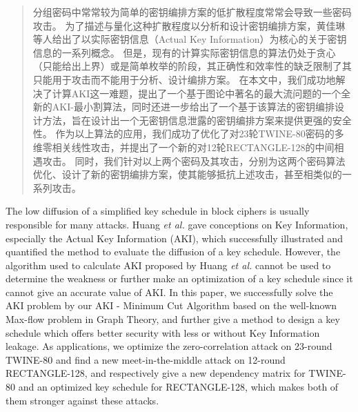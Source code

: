 
\begin{abstract}

分组密码中常常较为简单的密钥编排方案的低扩散程度常常会导致一些密码攻击。
为了描述与量化这种扩散程度以分析和设计密钥编排方案，黄佳琳等人给出了以实际密钥信息（Actual Key Information）为核心的关于密钥信息的一系列概念。
但是，现有的计算实际密钥信息的算法仍处于贪心（只能给出上界）或是简单枚举的阶段，其正确性和效率性的缺乏限制了其只能用于攻击而不能用于分析、设计编排方案。
在本文中，我们成功地解决了计算AKI这一难题，提出了一个基于图论中著名的最大流问题的一个全新的AKI-最小割算法，同时还进一步给出了一个基于该算法的密钥编排设计方法，旨在设计出一个无密钥信息泄露的密钥编排方案来提供更强的安全性。
作为以上算法的应用，我们成功了优化了对23轮TWINE-80密码的多维零相关线性攻击，并提出了一个新的对12轮RECTANGLE-128的中间相遇攻击。
同时，我们针对以上两个密码及其攻击，分别为这两个密码算法优化、设计了新的密钥编排方案，使其能够抵抗上述攻击，甚至相类似的一系列攻击。

\end{abstract}

\begin{englishabstract}

    The low diffusion of a simplified key schedule in block ciphers is usually responsible for many attacks.
    Huang \emph{et al.} gave conceptions on Key Information, especially the Actual Key Information (AKI), which successfully illustrated and quantified the method to evaluate the diffusion of a key schedule.
    However, the algorithm used to calculate AKI proposed by Huang \emph{et al.} cannot be used to determine the weakness or further make an optimization of a key schedule since it cannot give an accurate value of AKI.
    In this paper, we successfully solve the AKI problem by our AKI - Minimum Cut Algorithm based on the well-known Max-flow problem in Graph Theory,
    and further give a method to design a key schedule which offers better security with less or without Key Information leakage.
    As applications, we optimize the zero-correlation attack on 23-round TWINE-80 and find a new meet-in-the-middle attack on 12-round RECTANGLE-128,
    and respectively give a new dependency matrix for TWINE-80 and an optimized key schedule for RECTANGLE-128, which makes both of them stronger against these attacks.

\end{englishabstract}

